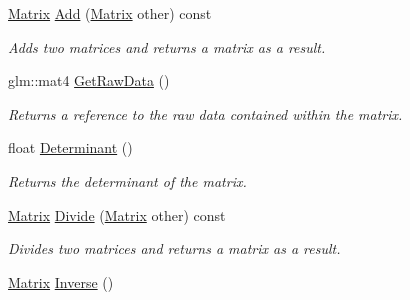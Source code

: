 \begin{DoxyCompactItemize}
\item 
\hypertarget{struct_jade_1_1_math_1_1_matrix_aa06e1c797c397f4ef041e0f1d9e5b572}{}\hyperlink{struct_jade_1_1_math_1_1_matrix}{Matrix} \hyperlink{struct_jade_1_1_math_1_1_matrix_aa06e1c797c397f4ef041e0f1d9e5b572}{Add} (\hyperlink{struct_jade_1_1_math_1_1_matrix}{Matrix} other) const \label{struct_jade_1_1_math_1_1_matrix_aa06e1c797c397f4ef041e0f1d9e5b572}

\begin{DoxyCompactList}\small\item\em Adds two matrices and returns a matrix as a result. \end{DoxyCompactList}\item 
\hypertarget{struct_jade_1_1_math_1_1_matrix_a02c948e4d28beeb6a7f59722b5877244}{}glm\+::mat4 \hyperlink{struct_jade_1_1_math_1_1_matrix_a02c948e4d28beeb6a7f59722b5877244}{Get\+Raw\+Data} ()\label{struct_jade_1_1_math_1_1_matrix_a02c948e4d28beeb6a7f59722b5877244}

\begin{DoxyCompactList}\small\item\em Returns a reference to the raw data contained within the matrix. \end{DoxyCompactList}\item 
\hypertarget{struct_jade_1_1_math_1_1_matrix_a8b030138c16b571491ec6880269a9bed}{}float \hyperlink{struct_jade_1_1_math_1_1_matrix_a8b030138c16b571491ec6880269a9bed}{Determinant} ()\label{struct_jade_1_1_math_1_1_matrix_a8b030138c16b571491ec6880269a9bed}

\begin{DoxyCompactList}\small\item\em Returns the determinant of the matrix. \end{DoxyCompactList}\item 
\hypertarget{struct_jade_1_1_math_1_1_matrix_a6dff4eaa15baad168ba91920b1ceaf93}{}\hyperlink{struct_jade_1_1_math_1_1_matrix}{Matrix} \hyperlink{struct_jade_1_1_math_1_1_matrix_a6dff4eaa15baad168ba91920b1ceaf93}{Divide} (\hyperlink{struct_jade_1_1_math_1_1_matrix}{Matrix} other) const \label{struct_jade_1_1_math_1_1_matrix_a6dff4eaa15baad168ba91920b1ceaf93}

\begin{DoxyCompactList}\small\item\em Divides two matrices and returns a matrix as a result. \end{DoxyCompactList}\item 
\hypertarget{struct_jade_1_1_math_1_1_matrix_a43739a3e24f48d8017b911aeb68c7092}{}\hyperlink{struct_jade_1_1_math_1_1_matrix}{Matrix} \hyperlink{struct_jade_1_1_math_1_1_matrix_a43739a3e24f48d8017b911aeb68c7092}{Inverse} ()\label{struct_jade_1_1_math_1_1_matrix_a43739a3e24f48d8017b911aeb68c7092}


\end{DoxyCompactItemize}
